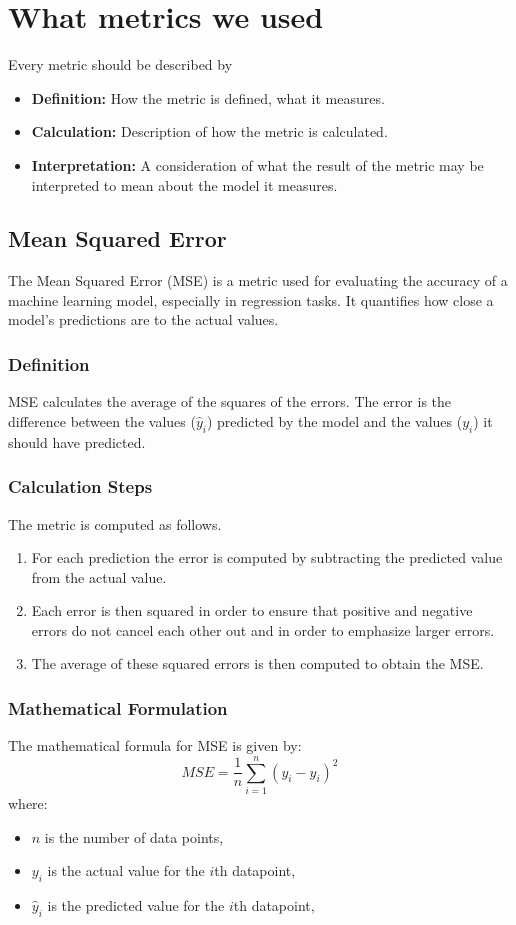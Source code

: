 \section{What metrics we used}
Every metric should be described by
\begin{itemize}
	\item \textbf{Definition:} How the metric is defined, what it measures.
	\item \textbf{Calculation:} Description of how the metric is calculated.
	\item \textbf{Interpretation:} A consideration of what the result of the metric may be interpreted to mean about the model it measures.
\end{itemize}
\subsection{Mean Squared Error}

The Mean Squared Error (MSE) is a metric used for evaluating the accuracy of a machine learning model, especially in regression tasks. It quantifies how close a model's predictions are to the actual values.

\subsubsection{Definition}
MSE calculates the average of the squares of the errors. The error is the difference between the values (\(\hat{y}_i\)) predicted by the model and the values (\(y_i\)) it should have predicted.

\subsubsection{Calculation Steps}
The metric is computed as follows.
\begin{enumerate}
	\item For each prediction the error is computed by subtracting the predicted value from the actual value.
	\item Each error is then squared in order to ensure that positive and negative errors do not cancel each other out and in order to emphasize larger errors.
	\item The average of these squared errors is then computed to obtain the MSE.
\end{enumerate}

\subsubsection{Mathematical Formulation}
The mathematical formula for MSE is given by:
\begin{equation}
	MSE = \frac{1}{n} \sum_{i=1}^{n} (y_i - \hat{y}_i)^2
\end{equation}
where:
\begin{itemize}
	\item \(n\) is the number of data points,
	\item \(y_i\) is the actual value for the \(i\)th datapoint,
	\item \(\hat{y}_i\) is the predicted value for the \(i\)th datapoint,
\end{itemize}


